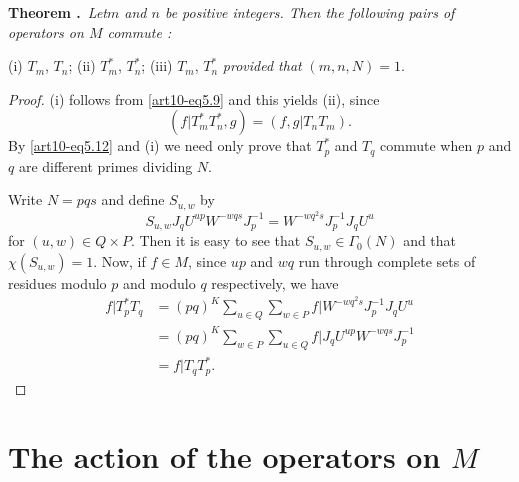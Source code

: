 \medskip
\noindent
{\bf Theorem .\label{art10-thm6.3}}~{\em Let\pageoriginale $m$ and $n$ be positive integers. Then the following pairs of operators on $M$ commute :}

(i) $T_{m}$, $T_{n}$; (ii) $T^{*}_{m}$, $T^{*}_{n}$; (iii) $T_{m}$, $T^{*}_{n}$ {\em provided that} $(m,n,N)=1$.

\begin{proof}
(i) follows from \eqref{art10-eq5.9} and this yields (ii), since
$$
(f|T^{*}_{m}T^{*}_{n},g)=(f,g|T_{n}T_{m}).
$$
By \eqref{art10-eq5.12} and (i) we need only prove that $T^{*}_{p}$ and $T_{q}$ commute when $p$ and $q$ are different primes dividing $N$.

Write $N=pqs$ and define $S_{u,w}$ by
$$
S_{u,w}J_{q}U^{up}W^{-wqs}J^{-1}_{p}=W^{-wq^{2}s}J^{-1}_{p}J_{q}U^{u}
$$
for $(u,w)\in Q\times P$. Then it is easy to see that $S_{u,w}\in \Gamma_{0}(N)$ and that $\chi(S_{u,w})=1$. Now, if $f\in M$, since $up$ and $wq$ run through complete sets of residues modulo $p$ and modulo $q$ respectively, we have
\begin{align*}
f|T^{*}_{p}T_{q} &= (pq)^{K}\sum\limits_{u\in Q}\sum\limits_{w\in P} f|W^{-wq^{2}s}J^{-1}_{p}J_{q}U^{u}\\[3pt]
&= (pq)^{K}\sum\limits_{w\in P}\sum\limits_{u\in Q}f|J_{q}U^{up}W^{-wqs}J^{-1}_{p}\\[3pt]
&= f|T_{q}T^{*}_{p}.
\end{align*}
\end{proof}

\section{The action of the operators on $M$}\label{art10-sec7}
~

